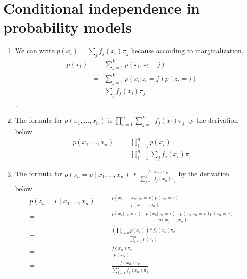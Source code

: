 \section{Conditional independence in probability models}
\begin{enumerate}
\item We can write $p(x_{i})=\sum_{j}f_{j}(x_{i})\pi_{j}$ because according
to marginalization, \begin{eqnarray*}
p(x_{i}) & = & \sum_{j=1}^{k}p(x_{i},z_{i}=j)\\
 & = & \sum_{j=1}^{k}p(x_{i}|z_{i}=j)p(z_{i}=j)\\
 & = & \sum_{j}f_{j}(x_{i})\pi_{j}\end{eqnarray*}
.
\item The formula for $p(x_{1},\dots,x_{n})$ is $\prod_{i=1}^{n}\sum_{j=1}^{k}f_{j}(x_{i})\pi_{j}$
by the derivation below. \begin{align*}
p(x_{1},\dots,x_{n})= & \;\prod_{i=1}^{n}p(x_{i})\\
= & \;\prod_{i=1}^{n}\sum_{j}f_{j}(x_{i})\pi_{j}\end{align*}

\item The formula for $p(z_{u}=v\mid x_{1},\dots,x_{n})$ is $\frac{f(x_{u})\pi_{v}}{\sum_{j=1}^{k}f_{j}(x_{u})\pi_{j}}$ by
the derivation below. \begin{align*}
p(z_{u}=v\mid x_{1},\dots,x_{n})= & \;\frac{p(x_{1},\dots,x_{n}|z_{u}=v)p(z_{u}=v)}{p(x_{1},\dots,x_{n})}\\
= & \;\frac{p(x_{1}|z_{u}=v)...p(x_{u}|z_{u}=v)...p(x_{n}|z_{u}=v)p(z_{u}=v)}{p(x_{1},\dots,x_{n})}\\
= & \;\frac{(\prod_{i\neq u}p(x_{i}))*f_{v}(x_{u})\pi_{v}}{\prod_{i=1}^{n}p(x_{i})}\\
= & \;\frac{f(x_{u})\pi_{v}}{p(x_{u})}\\
= & \;\frac{f(x_{u})\pi_{v}}{\sum_{j=1}^{k}f_{j}(x_{u})\pi_{j}}\end{align*}
 
\end{enumerate}
